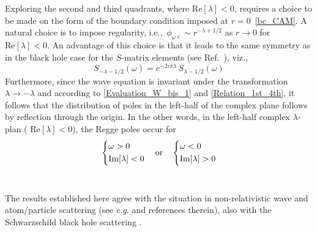 \documentclass[aps,prd,longbibliography,reprint,twocolumn,amsmath,amssymb,amsfonts,showpacs,footnote,superscriptaddress]{revtex4-1}%
\begin{document}
Exploring the second and third quadrants, where $\text{Re}[{\lambda}] < 0$, requires a choice to be made on the form of the boundary condition imposed at $r=0$~\eqref{bc_CAM}. A natural choice is to impose regularity, i.e.,~$\phi_{\omega\ell} \sim r^{-\lambda+1/2}$ as $r \rightarrow 0$ for $\text{Re} [\lambda] < 0$. An advantage of this choice is that it leads to the same symmetry as in the black hole case for the $S$-matrix elements (see Ref.~\cite{Andersson:1994rk,Folacci:2019cmc}), viz.,
\begin{equation}\label{Matrix_S_CAM_symm}
S_{-\lambda -1/2}(\omega) =  e^{-2i \pi \lambda} \, S_{\lambda -1/2}(\omega)
\end{equation}
Furthermore, since the wave equation is invariant under the transformation $\lambda \rightarrow -\lambda$ and according to \eqref{Evaluation_W_bis_1} and \eqref{Relation_1st_4th}, it follows that the distribution of poles in the left-half of the complex plane follows by reflection through the origin. In the other words, in the left-half complex $\lambda$-plan ( $\text{Re}[\lambda] < 0 $), the Regge poles occur for
\begin{equation}
    \begin{dcases}
        \omega>0 \\
        \text{Im}[\lambda]<0
     \end{dcases}
\quad\text{or}\quad
    \begin{dcases}
      \omega<0 \\
        \text{Im}[\lambda]>0
    \end{dcases}
\end{equation}\

The results established here agree with the situation in non-relativistic wave and atom/particle scattering (see \textit{e.g.} \cite{Newton:1982qc,Bottino1962} and references therein), also with the Schwarzschild black hole scattering \cite{Andersson:1994rk,Decanini:2009mu}.




\end{document}
